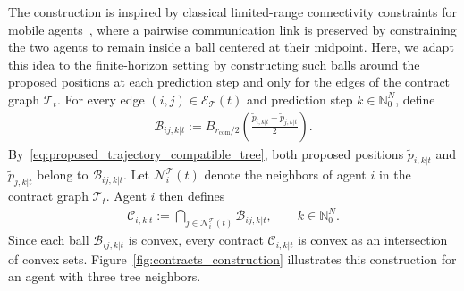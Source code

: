 \documentclass[letterpaper, 10 pt, conference]{ieeeconf}  %
\newcommand{\Ball}[2]{B_{#1}\!\left(#2\right)}
\begin{document}
The construction is inspired by classical limited-range connectivity constraints
for mobile agents~\cite{ando1999distributed,notarstefano2006maintaining}, where
a pairwise communication link is preserved by constraining the two agents to
remain inside a ball centered at their midpoint. Here, we adapt this idea to the
finite-horizon setting by constructing such balls around the proposed positions
at each prediction step and only for the edges of the contract graph
$\mathcal{T}_t$. For every edge $(i,j)\in\mathcal{E}_{\mathcal{T}}(t)$ and prediction step
$k\in\mathbb{N}_0^N$, define
\begin{align}
	\mathcal{B}_{ij,k|t}
	:=
	\Ball{r_{\mathrm{com}}/2}{
		\frac{\tilde p_{i,k|t}+\tilde p_{j,k|t}}{2}
	}.
	\label{eq:pairwise_ball_contract}
\end{align}
By~\eqref{eq:proposed_trajectory_compatible_tree}, both proposed positions
$\tilde p_{i,k|t}$ and $\tilde p_{j,k|t}$ belong to
$\mathcal{B}_{ij,k|t}$.
Let
$\mathcal{N}^{\mathcal{T}}_i(t)$ denote the neighbors of agent $i$ in the
contract graph $\mathcal{T}_t$. Agent $i$ then defines
\begin{align}
	\mathcal{C}_{i,k|t}
	:=
	\bigcap_{j\in\mathcal{N}^{\mathcal{T}}_i(t)}
	\mathcal{B}_{ij,k|t},
	\qquad
	k\in\mathbb{N}_0^N.
	\label{eq:connectivity_contract_intersection}
\end{align}
Since each ball $\mathcal{B}_{ij,k|t}$ is convex, every contract
$\mathcal{C}_{i,k|t}$ is convex as an intersection of convex sets.
Figure~\ref{fig:contracts_construction} illustrates this construction for an agent with three tree neighbors.
\end{document}
